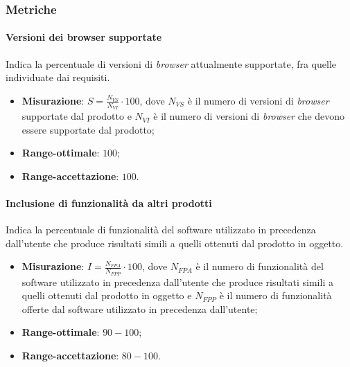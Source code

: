 \subsubsection{Metriche}
\paragraph{Versioni dei browser supportate}
Indica la percentuale di versioni di \textit{browser} attualmente supportate, fra quelle individuate dai requisiti.
\begin{itemize}
\item \textbf{Misurazione}: $S=\frac{N_{VS}}{N_{VI}} \cdot 100$, dove $N_{VS}$ è il numero di versioni di \textit{browser} supportate dal prodotto e $N_{VI}$ è il numero di versioni di \textit{browser} che devono essere supportate dal prodotto;
\item \textbf{Range-ottimale}: $100$;
\item \textbf{Range-accettazione}: $100$.
\end{itemize}
\paragraph{Inclusione di funzionalità da altri prodotti}
Indica la percentuale di funzionalità del software utilizzato in precedenza dall'utente che produce risultati simili a quelli ottenuti dal prodotto in oggetto.
\begin{itemize}
\item \textbf{Misurazione}: $I=\frac{N_{FPA}}{N_{FPP}} \cdot 100$, dove $N_{FPA}$ è il numero di funzionalità del software utilizzato in precedenza dall'utente che produce risultati simili a quelli ottenuti dal prodotto in oggetto e $N_{FPP}$ è il numero di funzionalità offerte dal software utilizzato in precedenza dall'utente;
\item \textbf{Range-ottimale}: $90 - 100$;
\item \textbf{Range-accettazione}: $80 - 100$.
\end{itemize}
